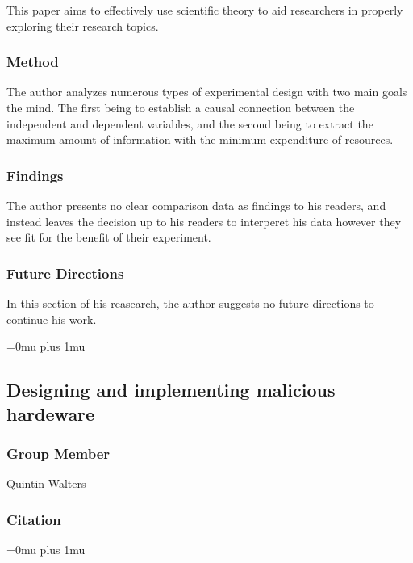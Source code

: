 \noindent
This paper aims to effectively use scientific theory to aid researchers in properly exploring their research topics.

\subsubsection{Method}

\noindent
The author analyzes numerous types of experimental design with two main goals the mind. The first being to establish a causal connection between the independent and dependent variables, and the second being to extract the maximum amount of information with the minimum expenditure of resources.

\subsubsection{Findings}

\noindent
The author presents no clear comparison data as findings to his readers, and instead leaves the decision up to his readers to interperet his data however they see fit for the benefit of their experiment.

\subsubsection{Future Directions}

\noindent
In this section of his reasearch, the author suggests no future directions to continue his work.

\Urlmuskip=0mu plus 1mu\relax

\noindent
\subsection{Designing and implementing malicious hardeware}

\subsubsection{Group Member}

\noindent
Quintin Walters

\noindent
\subsubsection{Citation}

\Urlmuskip=0mu plus 1mu\relax

